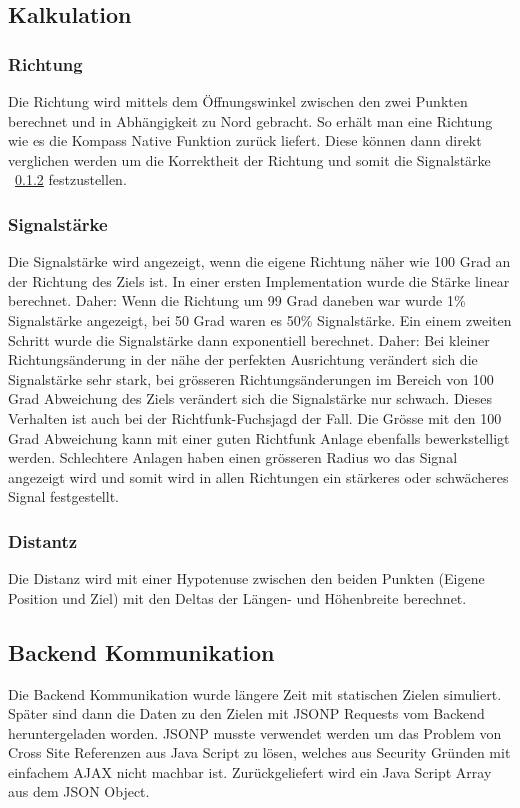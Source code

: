\subsection{Kalkulation} %
\label{sub:kalkulation}
\subsubsection{Richtung} %
\label{ssub:richtung}
Die Richtung wird mittels dem Öffnungswinkel zwischen den zwei Punkten berechnet und in Abhängigkeit zu Nord gebracht. So erhält man eine Richtung wie es die Kompass Native Funktion zurück liefert. Diese können dann direkt verglichen werden um die Korrektheit der Richtung und somit die Signalstärke ~\ref{ssub:signalstärke}
 festzustellen. 
\subsubsection{Signalstärke} %
\label{ssub:signalstärke}
Die Signalstärke wird angezeigt, wenn die eigene Richtung näher wie 100 Grad an der Richtung des Ziels ist. In einer ersten Implementation wurde die Stärke linear berechnet. Daher: Wenn die Richtung um 99 Grad daneben war wurde 1\% Signalstärke angezeigt, bei 50 Grad waren es 50\% Signalstärke. Ein einem zweiten Schritt wurde die Signalstärke dann exponentiell berechnet. Daher: Bei kleiner Richtungsänderung in der nähe der perfekten Ausrichtung verändert sich die Signalstärke sehr stark, bei grösseren Richtungsänderungen im Bereich von 100 Grad Abweichung des Ziels verändert sich die Signalstärke nur schwach. Dieses Verhalten ist auch bei der Richtfunk-Fuchsjagd der Fall. Die Grösse mit den 100 Grad Abweichung kann mit einer guten Richtfunk Anlage ebenfalls bewerkstelligt werden. Schlechtere Anlagen haben einen grösseren Radius wo das Signal angezeigt wird und somit wird in allen Richtungen ein stärkeres oder schwächeres Signal festgestellt.
\subsubsection{Distantz} %
\label{ssub:distantz}
Die Distanz wird mit einer Hypotenuse zwischen den beiden Punkten (Eigene Position und Ziel) mit den Deltas der Längen- und Höhenbreite berechnet. 

\subsection{Backend Kommunikation} %
\label{sub:backend_kommunikation}
Die Backend Kommunikation wurde längere Zeit mit statischen Zielen simuliert. Später sind dann die Daten zu den Zielen mit JSONP Requests vom Backend heruntergeladen worden. JSONP musste verwendet werden um das Problem von Cross Site Referenzen aus Java Script zu lösen, welches aus Security Gründen mit einfachem AJAX nicht machbar ist. Zurückgeliefert wird ein Java Script Array aus dem JSON Object.

